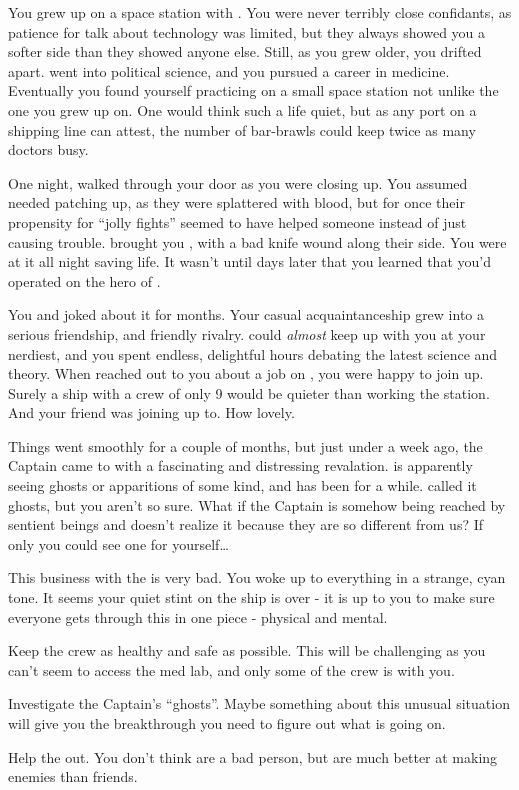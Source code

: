 \documentclass[char]{TMFHope}
\begin{document}
\name{\cMed{}}

You grew up on a space station with \cDip{}. You were never terribly close confidants, as \cDip{\their} patience for talk about technology was limited, but they always showed you a softer side than they showed anyone else. Still, as you grew older, you drifted apart. \cDip{} went into political science, and you pursued a career in medicine. Eventually you found yourself practicing on a small space station not unlike the one you grew up on. One would think such a life quiet, but as any port on a shipping line can attest, the number of bar-brawls could keep twice as many doctors busy.

One night, \cSci{} walked through your door as you were closing up. You assumed \cSci{\they} needed patching up, as they were splattered with blood, but for once their propensity for ``jolly fights'' seemed to have helped someone instead of just causing trouble. \cSci{\They} brought you \cCap{}, with a bad knife wound along their side. You were at it all night saving \cCap{\their} life. It wasn't until days later that you learned that you'd operated on the hero of \pBattle{}.

You and \cSci{} joked about it for months. Your casual acquaintanceship grew into a serious friendship, and friendly rivalry. \cSci{} could \emph{almost} keep up with you at your nerdiest, and you spent endless, delightful hours debating the latest science and theory. When \cCap{} reached out to you about a job on \pNew{}, you were happy to join up. Surely a ship with a crew of only 9 would be quieter than working the station. And your friend \cSci{} was joining up to. How lovely.

Things went smoothly for a couple of months, but just under a week ago, the Captain came to with a fascinating and distressing revalation. \cCap{} is apparently seeing ghosts or apparitions of some kind, and has been for a while. \cCap{\They} called it ghosts, but you aren't so sure. What if the Captain is somehow being reached by sentient beings and doesn't realize it because they are so different from us? If only you could see one for yourself\ldots

This business with the \pNew{} is very bad. You woke up to everything in a strange, cyan tone. It seems your quiet stint on the ship is over - it is up to you to make sure everyone gets through this in one piece - physical and mental.

\begin{itemz}[Goals]
	\item Keep the crew as healthy and safe as possible. This will be challenging as you can't seem to access the med lab, and only some of the crew is with you.
	\item Investigate the Captain's ``ghosts''. Maybe something about this unusual situation will give you the breakthrough you need to figure out what is going on.
	\item Help the \cDip{} out. You don't think \cDip{\they} are a bad person, but \cDip{\they} are much better at making enemies than friends.
\end{itemz}
\end{document}
